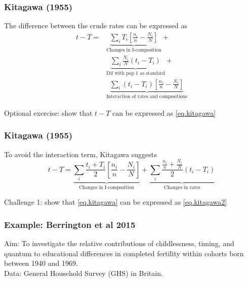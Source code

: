 \documentclass[xcolor={dvipsnames}]{beamer}
\begin{document}
\begin{frame}\frametitle{Kitagawa (1955)}

The difference between the crude rates can be expressed as
		\hphantom{}
\begin{equation}
\label{eq.kitagawa}
\begin{split}
t-T  = &  \underbrace{\sum_iT_i\left[\frac{n_i}{n}-\frac{N_i}{N}\right]}_{\text{Changes in I-composition}} + \\
	& \underbrace{\sum_i\frac{N_i}{N}(t_i-T_i)}_{\text{Dif with pop 1 as standard}} + \\  
 	& \underbrace{\sum_i(t_i-T_i)\left[\frac{n_i}{n}-\frac{N_i}{N}\right]}_{\text{Interaction of rates and compositions}}
\end{split}
\end{equation}

\small{Optional exercise: show that $t-T$ can be expressed as \eqref{eq.kitagawa}}
\end{frame}

\begin{frame}\frametitle{Kitagawa (1955)}

To avoid the interaction term, Kitagawa suggests
		\hphantom{}
\begin{equation}
\label{eq.kitagawa2}
t-T  =  \underbrace{\sum_i \frac{t_i+T_i}{2} \left[\frac{n_i}{n}-\frac{N_i}{N}\right]}_{\text{Changes in I-composition}} +
\underbrace{\sum_i\frac{\frac{n_i}{n}+\frac{N_i}{N}}{2}(t_i-T_i)}_{\text{Changes in rates}}
\end{equation}

\small{Challenge 1: show that \eqref{eq.kitagawa} can be expressed as \eqref{eq.kitagawa2}}
\end{frame}


\begin{frame}\frametitle{Example: Berrington et al 2015}

Aim: To investigate the relative contributions of childlessness, timing, and quantum to educational differences in completed fertility within cohorts born between 1940 and 1969.\\
\hphantom{}
Data: General Household Survey (GHS) in Britain.
\hphantom{}

\end{frame}
\end{document}

